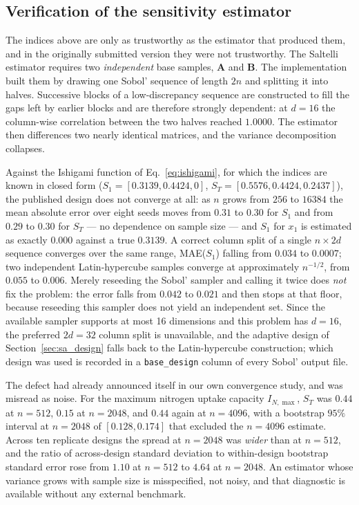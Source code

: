 \documentclass[a4paper,fleqn]{cas-sc}
\begin{document}
\subsection{Verification of the sensitivity estimator}
\label{sec:results_estimator}

The indices above are only as trustworthy as the estimator that produced
them, and in the originally submitted version they were not trustworthy.
The Saltelli estimator requires two \emph{independent} base samples,
$\mathbf{A}$ and $\mathbf{B}$. The implementation built them by drawing one
Sobol' sequence of length $2n$ and splitting it into halves. Successive
blocks of a low-discrepancy sequence are constructed to fill the gaps left by
earlier blocks and are therefore strongly dependent: at $d = 16$ the
column-wise correlation between the two halves reached $1.0000$. The
estimator then differences two nearly identical matrices, and the variance
decomposition collapses.

Against the Ishigami function of Eq.~\eqref{eq:ishigami}, for which the
indices are known in closed form ($S_1 = [0.3139, 0.4424, 0]$,
$S_T = [0.5576, 0.4424, 0.2437]$), the published design does not converge at
all: as $n$ grows from $256$ to $16384$ the mean absolute error over eight
seeds moves from $0.31$ to $0.30$ for $S_1$ and from $0.29$ to $0.30$ for
$S_T$ --- no dependence on sample size --- and $S_1$ for $x_1$ is estimated as
exactly $0.000$ against a true $0.3139$. A correct column split of a single
$n\times 2d$ sequence converges over the same range, MAE($S_1$) falling from
$0.034$ to $0.0007$; two independent Latin-hypercube samples converge at
approximately $n^{-1/2}$, from $0.055$ to $0.006$. Merely reseeding the
Sobol' sampler and calling it twice does \emph{not} fix the problem: the error
falls from $0.042$ to $0.021$ and then stops at that floor, because reseeding
this sampler does not yield an independent set. Since the available sampler
supports at most 16 dimensions and this problem has $d = 16$, the preferred
$2d = 32$ column split is unavailable, and the adaptive design of
Section~\ref{sec:sa_design} falls back to the Latin-hypercube construction;
which design was used is recorded in a \texttt{base\_design} column of every
Sobol' output file.

The defect had already announced itself in our own convergence study, and was
misread as noise. For the maximum nitrogen uptake capacity $I_{N,\max}$, $S_T$ was
$0.44$ at $n = 512$, $0.15$ at $n = 2048$, and $0.44$ again at $n = 4096$,
with a bootstrap $95\%$ interval at $n = 2048$ of $[0.128, 0.174]$ that
excluded the $n = 4096$ estimate. Across ten replicate designs the spread at
$n = 2048$ was \emph{wider} than at $n = 512$, and the ratio of across-design
standard deviation to within-design bootstrap standard error rose from $1.10$
at $n = 512$ to $4.64$ at $n = 2048$. An estimator whose variance grows with
sample size is misspecified, not noisy, and that diagnostic is available
without any external benchmark.
\end{document}
